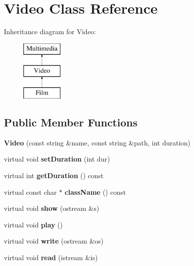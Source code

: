 \hypertarget{class_video}{}\section{Video Class Reference}
\label{class_video}
Inheritance diagram for Video\+:\begin{figure}[H]
\begin{center}
\leavevmode
\includegraphics[height=3.000000cm]{class_video}
\end{center}
\end{figure}
\subsection*{Public Member Functions}
\begin{DoxyCompactItemize}
\item 
\mbox{\label{class_video_ace2a1b151bbe15582a18abc6864ff59b}} 
{\bfseries Video} (const string \&name, const string \&path, int duration)
\item 
\mbox{\label{class_video_a59b267094d61d47042569c076373fdc1}} 
virtual void {\bfseries set\+Duration} (int dur)
\item 
\mbox{\label{class_video_a57f903f1d582ac6ef88922c7a6cb8f7f}} 
virtual int {\bfseries get\+Duration} () const
\item 
\mbox{\label{class_video_a688a5857a99adc59bb9eadad41a7fae2}} 
virtual const char $\ast$ {\bfseries class\+Name} () const
\item 
\mbox{\label{class_video_afdbd56536abc9aedfd39785525fb978d}} 
virtual void {\bfseries show} (ostream \&s)
\item 
\mbox{\label{class_video_a192acb2bbb1592566ec2393dc99e3083}} 
virtual void {\bfseries play} ()
\item 
\mbox{\label{class_video_ac203fe05a5be8a8f0e03147e7e2221c2}} 
virtual void {\bfseries write} (ostream \&os)
\item 
\mbox{\label{class_video_ac425b62acc23373d51113b3835cc768d}} 
virtual void {\bfseries read} (istream \&is)
\end{DoxyCompactItemize}


